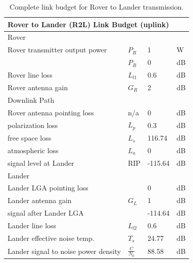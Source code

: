 \begin{table}[]
\centering
\caption{Complete link budget for Rover to Lander transmission.}
\label{tab:lb-R2L}
\begin{tabular}{llll}
\multicolumn{4}{l}{Rover to Lander (R2L) Link Budget (uplink)}                   \\ \hline
\multicolumn{4}{l}{\cellcolor[HTML]{DAE8FC}Rover}                                \\
Rover transmitter output power            &${P}_{R}$		& 1                      & W    \\
                                          &${P}_{R}$    & 0                      & dB   \\
Rover line loss                           &${L}_{l1}$   & 0.6                    & dB   \\
Rover antenna gain                        &${G}_{R}$ 	& 2                      & dB   \\
\multicolumn{4}{l}{\cellcolor[HTML]{DAE8FC}Downlink Path}                        \\
Rover antenna pointing loss               &n/a    		& 0                      & dB   \\
polarization loss                     	  &${L}_{p}$		& 0.3                    & dB   \\
free space loss                           &${L}_{s}$		& 116.74                 & dB   \\
atmospheric loss                          &${L}_{a}$		& 0                      & dB   \\ \hline
signal level at Lander                    &RIP      		& -115.64                & dB   \\
\multicolumn{4}{l}{\cellcolor[HTML]{DAE8FC}Lander}                               \\
Lander LGA pointing loss                  &      		& 0                      & dB   \\
Lander antenna gain                       &${G}_{L}$		& 1                      & dB   \\ \hline
signal after Lander LGA                   &      		& -114.64                & dB   \\ \hline
Lander line loss                    		  &${L}_{l2}$	& 0.6                    & dB   \\
Lander effective noise temp.              &${T}_{s}$ 	& 24.77                  & dB   \\ \hline
Lander signal to noise power density      & $\frac{C}{{N}_{0}}$ & 88.58                  & dB   \\ \hline

\end{tabular}
\end{table}
